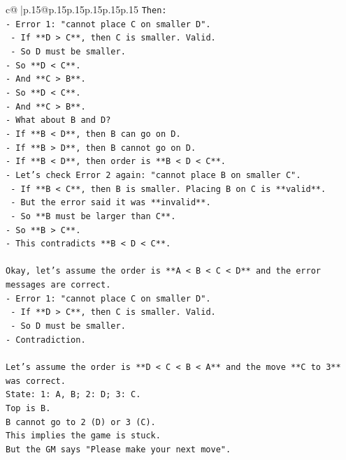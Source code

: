 \documentclass{article}
\begin{document}
{\begin{supertabular}{c@{$\;$}|p{.15\linewidth}@{}p{.15\linewidth}p{.15\linewidth}p{.15\linewidth}p{.15\linewidth}p{.15\linewidth}}
{{{\texttt{Then:} \\
\texttt{{-} Error 1: "cannot place C on smaller D".} \\
\texttt{    {-} If **D > C**, then C is smaller. Valid.} \\
\texttt{    {-} So D must be smaller.} \\
\texttt{{-} So **D < C**.} \\
\texttt{{-} And **C > B**.} \\
\texttt{{-} So **D < C**.} \\
\texttt{{-} And **C > B**.} \\
\texttt{{-} What about B and D?} \\
\texttt{{-} If **B < D**, then B can go on D.} \\
\texttt{{-} If **B > D**, then B cannot go on D.} \\
\texttt{{-} If **B < D**, then order is **B < D < C**.} \\
\texttt{{-} Let's check Error 2 again: "cannot place B on smaller C".} \\
\texttt{    {-} If **B < C**, then B is smaller. Placing B on C is **valid**.} \\
\texttt{    {-} But the error said it was **invalid**.} \\
\texttt{    {-} So **B must be larger than C**.} \\
\texttt{{-} So **B > C**.} \\
\texttt{{-} This contradicts **B < D < C**.} \\
\\ 
\texttt{Okay, let's assume the order is **A < B < C < D** and the error messages are correct.} \\
\texttt{{-} Error 1: "cannot place C on smaller D".} \\
\texttt{    {-} If **D > C**, then C is smaller. Valid.} \\
\texttt{    {-} So D must be smaller.} \\
\texttt{{-} Contradiction.} \\
\\ 
\texttt{Let's assume the order is **D < C < B < A** and the move **C to 3** was correct.} \\
\texttt{State: 1: A, B; 2: D; 3: C.} \\
\texttt{Top is B.} \\
\texttt{B cannot go to 2 (D) or 3 (C).} \\
\texttt{This implies the game is stuck.} \\
\texttt{But the GM says "Please make your next move".} \\
}}}
\end{supertabular}}
\end{document}
